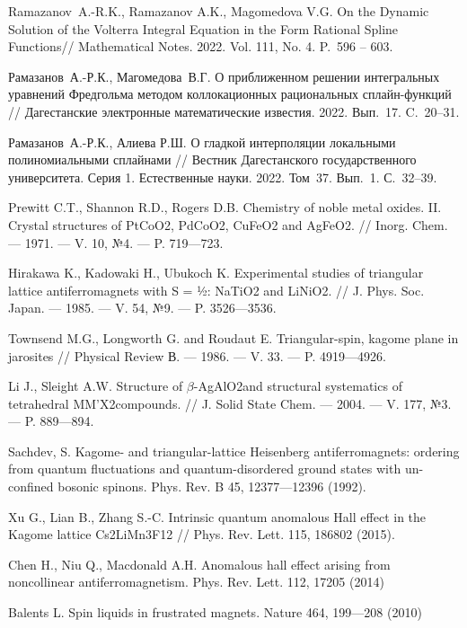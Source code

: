 \begin{thebibliography}{111}
 Ramazanov~A.-R.K., Ramazanov A.K., Magomedova V.G.
On the Dynamic Solution of the Volterra Integral Equation in the Form
Rational Spline Functions// Mathematical Notes. 2022. Vol. 111, No. 4.
P.~596 – 603.

 Рамазанов~А.-Р.К., Магомедова~В.Г.
 О приближенном решении интегральных уравнений Фредгольма методом
коллокационных рациональных сплайн-функций //
Дагестанские электронные математические известия. 2022. Вып.~17. C.~20--31.

 Рамазанов~А.-Р.К., Алиева Р.Ш. О гладкой интерполяции
 локальными полиномиальными сплайнами // Вестник Дагестанского
государственного университета. Серия 1. Естественные науки. 2022. Том~37.
 Вып.~1. С.~32--39.


  
  Prewitt C.T., Shannon R.D., Rogers D.B.
  Chemistry of noble metal oxides. II. Crystal structures of PtCoO2, PdCoO2, CuFeO2 and AgFeO2.
  //
  Inorg. Chem.
  --- 1971.
  --- V. 10, №4.
  --- P. 719---723.
  
  Hirakawa K., Kadowaki H., Ubukoch K.
  Experimental studies of triangular lattice antiferromagnets with S = ½: NaTiO2 and LiNiO2.
  //
  J. Phys. Soc. Japan.
  --- 1985.
  --- V. 54, №9.
  --- P. 3526---3536.
  
  Townsend M.G., Longworth G. and Roudaut E.
  Triangular-spin, kagome plane in jarosites
  //
  Physical Review В.
  --- 1986.
  --- V. 33.
  --- P. 4919---4926.
  
  Li J., Sleight A.W.
  Structure of $\beta$-AgAlO2and structural systematics of tetrahedral MM'X2compounds.
  //
  J. Solid State Chem.
  --- 2004.
  --- V. 177, №3.
  --- P. 889---894.
  
  Sachdev, S.
  Kagome- and triangular-lattice Heisenberg antiferromagnets: ordering from quantum fluctuations and quantum-disordered ground states with un-confined bosonic spinons. Phys. Rev. B 45, 12377---12396 (1992).
  
  Xu G., Lian B., Zhang S.-C.
  Intrinsic quantum anomalous Hall effect in the Kagome lattice Cs2LiMn3F12
  //
  Phys. Rev. Lett. 115, 186802 (2015).
  
  Chen H., Niu Q., Macdonald A.H.
  Anomalous hall effect arising from noncollinear antiferromagnetism. Phys. Rev. Lett. 112, 17205 (2014)
  
  Balents L.
  Spin liquids in frustrated magnets. Nature 464, 199---208 (2010)
  

\end{thebibliography}
